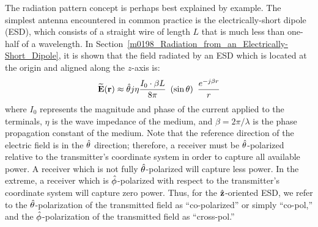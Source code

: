 The radiation pattern concept is perhaps best explained by example.
The simplest antenna encountered in common practice is the electrically-short dipole (ESD), which consists of a straight wire of length $L$ that is much less than one-half of a wavelength.
In Section~\ref{m0198_Radiation_from_an_Electrically-Short_Dipole}, it is shown that the field radiated by an ESD which is located at the origin and aligned along the $z$-axis is:
%
\begin{equation}
\widetilde{\bf E}({\bf r}) \approx  \hat{\bf \theta} j \eta \frac{I_0\cdot\beta L}{8\pi} ~\left(\sin\theta\right) ~\frac{e^{-j\beta r}}{r}
\label{m0205_eESDE}
\end{equation}
%
where $I_0$ represents the magnitude and phase of the current applied to the terminals, $\eta$ is the wave impedance of the medium, and $\beta=2\pi/\lambda$ is the phase propagation constant of the medium.
Note that the reference direction of the electric field is in the $\hat{\bf \theta}$ direction; therefore, a receiver must be $\hat{\bf \theta}$-polarized relative to the transmitter's coordinate system in order to capture all available power.
A receiver which is not fully $\hat{\bf \theta}$-polarized will capture less power.
In the extreme, a receiver which is $\hat{\bf \phi}$-polarized with respect to the transmitter's coordinate system will capture zero power.
Thus, for the $\hat{\bf z}$-oriented ESD, we refer to the $\hat{\bf \theta}$-polarization of the transmitted field as ``co-polarized'' or simply ``co-pol,'' and
the $\hat{\bf \phi}$-polarization of the transmitted field as ``cross-pol.''

